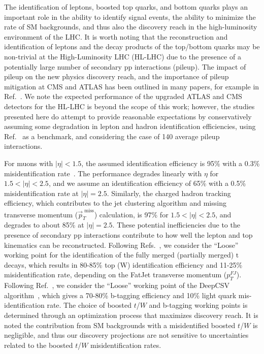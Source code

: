 The identification of leptons, boosted top quarks, and bottom quarks plays an important role in the ability to identify signal events, the ability to minimize the rate of SM backgrounds, and thus also the discovery reach in the high-luminosity environment of the LHC. It is worth noting that the reconstruction and identification of leptons and the decay products of the top/bottom quarks may be non-trivial at the High-Luminosity LHC (HL-LHC) due to the presence of a potentially large number of secondary pp interactions (pileup). The impact of pileup on the new physics discovery reach, and the importance of pileup mitigation at CMS and ATLAS has been outlined in many papers, for example in Ref.~\parencite{CMS-PAS-FTR-13-014}. We note the expected performance of the upgraded ATLAS and CMS detectors for the HL-LHC is beyond the scope of this work; however, the studies presented here do attempt to provide reasonable expectations by conservatively assuming some degradation in lepton and hadron identification efficiencies, using Ref.~\parencite{CMS-PAS-FTR-13-014} as a benchmark, and considering the case of 140 average pileup interactions. 

For muons with $|\eta|< 1.5$, the assumed identification efficiency is 95\% with a 0.3\% misidentification rate~\parencite{CMS-PAS-FTR-13-014,CMS_MUON_17001}. The performance degrades linearly with $\eta$ for $1.5 < |\eta| < 2.5$, and we assume an identification efficiency of 65\% with a 0.5\% misidentification rate at $|\eta| = 2.5$. Similarly, the charged hadron tracking efficiency, which contributes to the jet clustering algorithm and missing transverse momentum ($\vec{p}_{T}^{\textrm{~miss}}$) calculation, is 97\% for $1.5 < |\eta| < 2.5$, and degrades to about 85\% at $|\eta| = 2.5$. These potential inefficiencies due to the presence of secondary pp interactions contribute to how well the lepton and top kinematics can be reconstructed. Following Refs.~\parencite{CMS:2020poo,ATLAS:2018wis}, we consider the ``Loose'' working point for the identification of the fully merged (partially merged) $\mathrm{t}$ decays, which results in 80-85\% top (W) identification efficiency and 11-25\% misidentification rate, depending on the FatJet transverse momentum ($p_{T}^{FJ}$). Following Ref.~\parencite{CMSbtag}, we consider the ``Loose'' working point of the DeepCSV algorithm~\parencite{Bols_2020}, which gives a 70-80\% b-tagging efficiency and 10\% light quark mis-identification rate. The choice of boosted $t$/$W$ and b-tagging working points is determined through an optimization process that maximizes discovery reach. It is noted the contribution from SM backgrounds with a misidentified boosted $t$/$W$ is negligible, and thus our discovery projections are not sensitive to uncertainties related to the boosted $t$/$W$ misidentification rates. 


